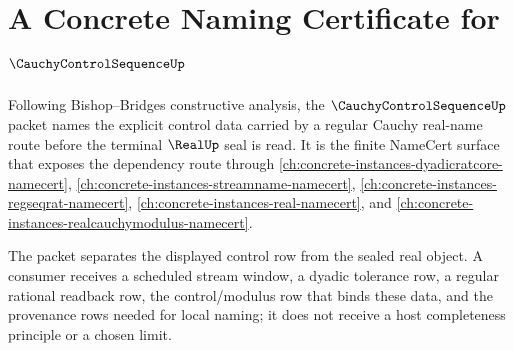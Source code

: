 \chapter{A Concrete Naming Certificate for $\CauchyControlSequenceUp$}
\label{ch:concrete-instances-cauchycontrolsequence-namecert}

Following Bishop--Bridges constructive analysis, the $\CauchyControlSequenceUp$ packet names the explicit control data carried by a regular Cauchy real-name route before the terminal $\RealUp$ seal is read. It is the finite NameCert surface that exposes the dependency route through \autoref{ch:concrete-instances-dyadicratcore-namecert}, \autoref{ch:concrete-instances-streamname-namecert}, \autoref{ch:concrete-instances-regseqrat-namecert}, \autoref{ch:concrete-instances-real-namecert}, and \autoref{ch:concrete-instances-realcauchymodulus-namecert}.

The packet separates the displayed control row from the sealed real object. A consumer receives a scheduled stream window, a dyadic tolerance row, a regular rational readback row, the control/modulus row that binds these data, and the provenance rows needed for local naming; it does not receive a host completeness principle or a chosen limit.

